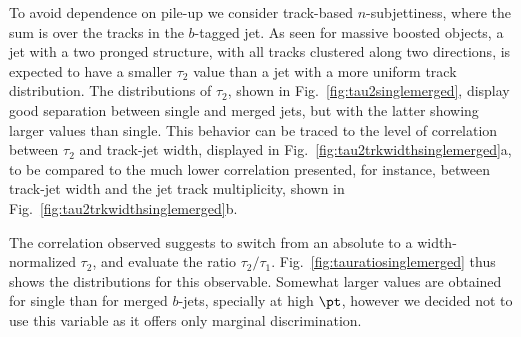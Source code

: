 


To avoid dependence on pile-up we consider track-based $n$-subjettiness, where the sum 
 is over the tracks in the $b$-tagged jet. As seen for massive boosted objects, a jet with a two pronged structure, with all tracks clustered along two directions, is expected to have a smaller $\tau_2$ value than a jet with a more uniform track distribution. The distributions of $\tau_2$, shown in Fig.~\ref{fig:tau2singlemerged}, display good separation between single and merged jets, but with the latter showing larger values than single. 
This behavior can be traced to the level of correlation between $\tau_2$ and track-jet width, displayed in Fig.~\ref{fig:tau2trkwidthsinglemerged}a, to be compared to the much lower correlation presented, for instance, between track-jet width and the jet track multiplicity, shown in  Fig.~\ref{fig:tau2trkwidthsinglemerged}b. 

The correlation observed suggests to switch from an absolute to a width-normalized $\tau_2$, and evaluate the ratio $\tau_2/\tau_1$. Fig.~\ref{fig:tauratiosinglemerged} thus shows the distributions for this observable. Somewhat larger values are obtained for single than for merged $b$-jets, specially at high $\pt$, however we decided not to use this variable as it offers only marginal discrimination. 



